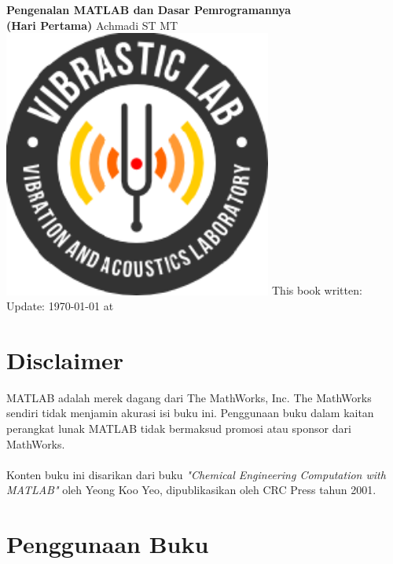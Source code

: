 \documentclass[12pt]{book}
\date{}
\begin{document}
	\frontmatter
	\begin{titlepage}
		\centering
		{\LARGE \bf Pengenalan MATLAB dan Dasar Pemrogramannya}\\
		{\LARGE \bf (Hari Pertama)}
		\vfill
		{\Large Achmadi ST MT}
		\vfill
		\includegraphics[width=250pt]{images/logo/logoviblab}
		\vfill
		\vfill
		\noindent This book written:\\
		Update: {\today} at \currenttime\\
	\end{titlepage}


	\newpage
	\tableofcontents


	\newpage
	\chapter{Disclaimer}

	MATLAB adalah merek dagang dari The MathWorks, Inc.
	The MathWorks sendiri tidak menjamin akurasi isi buku ini.
	Penggunaan buku dalam kaitan perangkat lunak MATLAB tidak bermaksud promosi atau sponsor dari MathWorks.
	\\
	\\
	Konten buku ini disarikan dari buku \textit{"Chemical Engineering Computation with MATLAB"} oleh Yeong Koo Yeo,
	dipublikasikan oleh CRC Press tahun 2001.


	\newpage
	\chapter{Penggunaan Buku}
\end{document}
